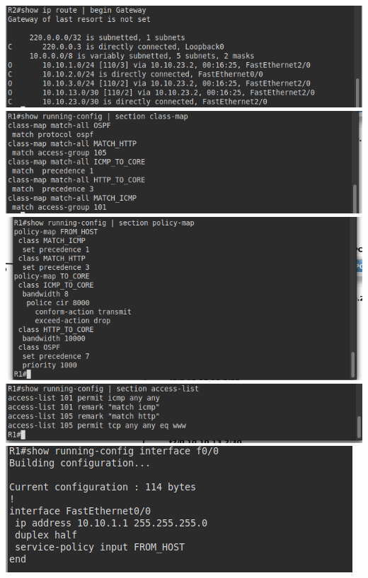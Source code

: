 \documentclass[10pt]{article}
\begin{document}
\begin{center}
  \includegraphics[scale=0.5]{imgs/2.png}\\
  \includegraphics[scale=0.5]{imgs/3.png}\\
  \includegraphics[scale=0.5]{imgs/4.png}\\
  \includegraphics[scale=0.5]{imgs/5.png}\\
  \includegraphics[scale=0.5]{imgs/6.png}\\

\end{center}
\end{document}

